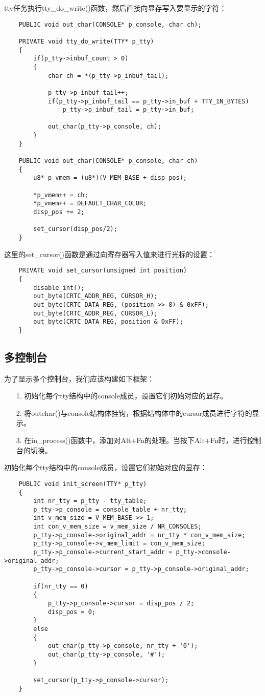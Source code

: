 \documentclass[a4paper,left=2.5cm,right=2.5cm,11pt]{article}
\begin{document}
	tty任务执行tty\_do\_write()函数，然后直接向显存写入要显示的字符：
	\begin{lstlisting}
	PUBLIC void out_char(CONSOLE* p_console, char ch);

	PRIVATE void tty_do_write(TTY* p_tty)
	{
		if(p_tty->inbuf_count > 0)
		{
			char ch = *(p_tty->p_inbuf_tail);
			
			p_tty->p_inbuf_tail++;
			if(p_tty->p_inbuf_tail == p_tty->in_buf + TTY_IN_BYTES)
				p_tty->p_inbuf_tail = p_tty->in_buf;
			
			out_char(p_tty->p_console, ch);
		}
	}

	PUBLIC void out_char(CONSOLE* p_console, char ch)
	{
		u8* p_vmem = (u8*)(V_MEM_BASE + disp_pos);

		*p_vmem++ = ch;
		*p_vmem++ = DEFAULT_CHAR_COLOR;
		disp_pos += 2;

		set_cursor(disp_pos/2);
	}
	\end{lstlisting}

	这里的set\_cursor()函数是通过向寄存器写入值来进行光标的设置：
	\begin{lstlisting}
	PRIVATE void set_cursor(unsigned int position)
	{
		disable_int();
		out_byte(CRTC_ADDR_REG, CURSOR_H);
		out_byte(CRTC_DATA_REG, (position >> 8) & 0xFF);
		out_byte(CRTC_ADDR_REG, CURSOR_L);
		out_byte(CRTC_DATA_REG, position & 0xFF);
	}
	\end{lstlisting}

\subsection{多控制台}
	为了显示多个控制台，我们应该构建如下框架：
	\begin{itemize}
		\item[1.] 初始化每个tty结构中的console成员，设置它们初始对应的显存。
		\item[2.] 将outchar()与console结构体挂钩，根据结构体中的cursor成员进行字符的显示。
		\item[3.] 在in\_process()函数中，添加对Alt+Fn的处理。当按下Alt+Fn时，进行控制台的切换。
	\end{itemize}

	初始化每个tty结构中的console成员，设置它们初始对应的显存：
	\begin{lstlisting}
	PUBLIC void init_screen(TTY* p_tty)
	{
		int nr_tty = p_tty - tty_table;
		p_tty->p_console = console_table + nr_tty;
		int v_mem_size = V_MEM_BASE >> 1;
		int con_v_mem_size = v_mem_size / NR_CONSOLES;
		p_tty->p_console->original_addr = nr_tty * con_v_mem_size;
		p_tty->p_console->v_mem_limit = con_v_mem_size;
		p_tty->p_console->current_start_addr = p_tty->console->original_addr;
		p_tty->p_console->cursor = p_tty->p_console->original_addr;

		if(nr_tty == 0)
		{
			p_tty->p_console->cursor = disp_pos / 2;
			disp_pos = 0;
		}
		else
		{
			out_char(p_tty->p_console, nr_tty + '0');
			out_char(p_tty->p_console, '#');
		}

		set_cursor(p_tty->p_console->cursor);
	}
	\end{lstlisting}
\end{document}
